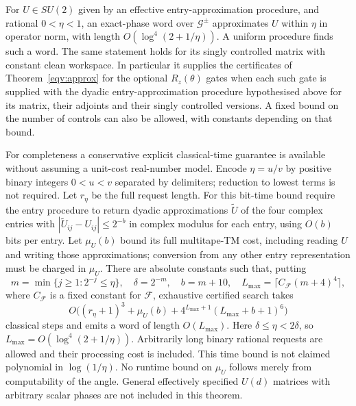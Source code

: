 \begin{theorem}
\label{eqv:rotations}
For $U\in SU(2)$ given by an effective entry-approximation procedure,
and rational $0<\eta<1$, an exact-phase word over $\mathcal G^{\pm}$
approximates $U$ within $\eta$ in operator norm, with length
$O(\log^4(2+1/\eta))$. A uniform procedure finds such a word.
The same statement holds for its singly controlled matrix with
constant clean workspace. In particular it supplies the certificates
of Theorem~\ref{eqv:approx} for the optional $R_z(\theta)$ gates when each such gate is supplied with the dyadic entry-approximation procedure hypothesised above for its matrix, their adjoints and their singly controlled
versions. A fixed bound on the number of controls can also be allowed,
with constants depending on that bound.

For completeness a conservative explicit classical-time guarantee is
available without assuming a unit-cost real-number model. Encode
$\eta=u/v$ by positive binary integers $0<u<v$ separated by delimiters;
reduction to lowest terms is not required. Let $r_\eta$ be the full
request length. For this bit-time bound require the entry procedure to
return dyadic approximations $\tilde U$ of the four complex entries with $|\tilde U_{ij}-U_{ij}|\le2^{-b}$ in complex modulus for each entry,
using $O(b)$ bits per entry. Let $\mu_U(b)$ bound its full multitape-TM
cost, including reading $U$ and writing those approximations; conversion
from any other entry representation must be charged in $\mu_U$.
There are absolute constants such that, putting
\[
 m=\min\{j\geq1:2^{-j}\leq\eta\},\quad
 \delta=2^{-m},\quad b=m+10,\quad
 L_{\max}=\lceil C_{\mathcal F}(m+4)^4\rceil,
\]
where $C_{\mathcal F}$ is a fixed constant for $\mathcal F$, exhaustive certified
search takes
\[
 O\bigl((r_\eta+1)^3+\mu_U(b)+4^{L_{\max}+1}(L_{\max}+b+1)^6\bigr)
\]
classical steps and emits a word of length $O(L_{\max})$.
Here $\delta\leq\eta<2\delta$, so
$L_{\max}=O(\log^4(2+1/\eta))$. Arbitrarily long binary rational requests
are allowed and their processing cost is included.
This time bound is not claimed polynomial in $\log(1/\eta)$.
No runtime bound on $\mu_U$ follows merely from computability of
the angle. General effectively specified $U(d)$ matrices with arbitrary
scalar phases are not included in this theorem.
\end{theorem}
